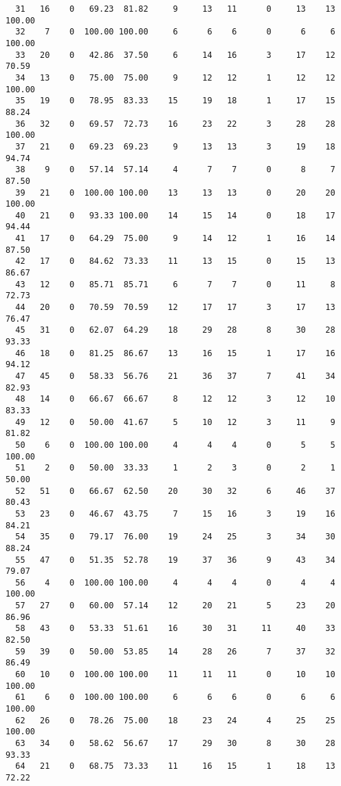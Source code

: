 \begin{verbatim}
  31   16    0   69.23  81.82     9     13   11      0     13    13   100.00
  32    7    0  100.00 100.00     6      6    6      0      6     6   100.00
  33   20    0   42.86  37.50     6     14   16      3     17    12    70.59
  34   13    0   75.00  75.00     9     12   12      1     12    12   100.00
  35   19    0   78.95  83.33    15     19   18      1     17    15    88.24
  36   32    0   69.57  72.73    16     23   22      3     28    28   100.00
  37   21    0   69.23  69.23     9     13   13      3     19    18    94.74
  38    9    0   57.14  57.14     4      7    7      0      8     7    87.50
  39   21    0  100.00 100.00    13     13   13      0     20    20   100.00
  40   21    0   93.33 100.00    14     15   14      0     18    17    94.44
  41   17    0   64.29  75.00     9     14   12      1     16    14    87.50
  42   17    0   84.62  73.33    11     13   15      0     15    13    86.67
  43   12    0   85.71  85.71     6      7    7      0     11     8    72.73
  44   20    0   70.59  70.59    12     17   17      3     17    13    76.47
  45   31    0   62.07  64.29    18     29   28      8     30    28    93.33
  46   18    0   81.25  86.67    13     16   15      1     17    16    94.12
  47   45    0   58.33  56.76    21     36   37      7     41    34    82.93
  48   14    0   66.67  66.67     8     12   12      3     12    10    83.33
  49   12    0   50.00  41.67     5     10   12      3     11     9    81.82
  50    6    0  100.00 100.00     4      4    4      0      5     5   100.00
  51    2    0   50.00  33.33     1      2    3      0      2     1    50.00
  52   51    0   66.67  62.50    20     30   32      6     46    37    80.43
  53   23    0   46.67  43.75     7     15   16      3     19    16    84.21
  54   35    0   79.17  76.00    19     24   25      3     34    30    88.24
  55   47    0   51.35  52.78    19     37   36      9     43    34    79.07
  56    4    0  100.00 100.00     4      4    4      0      4     4   100.00
  57   27    0   60.00  57.14    12     20   21      5     23    20    86.96
  58   43    0   53.33  51.61    16     30   31     11     40    33    82.50
  59   39    0   50.00  53.85    14     28   26      7     37    32    86.49
  60   10    0  100.00 100.00    11     11   11      0     10    10   100.00
  61    6    0  100.00 100.00     6      6    6      0      6     6   100.00
  62   26    0   78.26  75.00    18     23   24      4     25    25   100.00
  63   34    0   58.62  56.67    17     29   30      8     30    28    93.33
  64   21    0   68.75  73.33    11     16   15      1     18    13    72.22

\end{verbatim}
